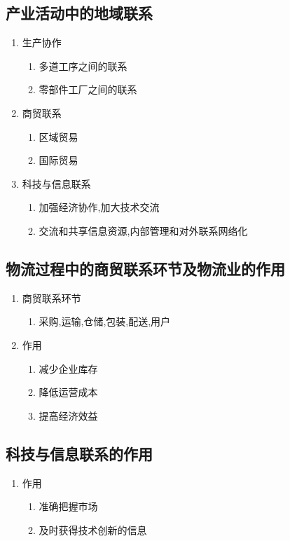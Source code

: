 \documentclass[a4paper]{article}
\begin{document}
    \subsection{产业活动中的地域联系}
    \begin{enumerate}
        \item 生产协作
        \begin{enumerate}
            \item 多道工序之间的联系
            \item 零部件工厂之间的联系
        \end{enumerate}
        \item 商贸联系
        \begin{enumerate}
            \item 区域贸易
            \item 国际贸易
        \end{enumerate}
        \item 科技与信息联系
        \begin{enumerate}
            \item 加强经济协作,加大技术交流
            \item 交流和共享信息资源,内部管理和对外联系网络化
        \end{enumerate}
    \end{enumerate}
    \subsection{物流过程中的商贸联系环节及物流业的作用}
    \begin{enumerate}
        \item 商贸联系环节
        \begin{enumerate}
            \item 采购,运输,仓储,包装,配送,用户
        \end{enumerate}
        \item 作用
        \begin{enumerate}
            \item 减少企业库存
            \item 降低运营成本
            \item 提高经济效益
        \end{enumerate}
    \end{enumerate}
    \subsection{科技与信息联系的作用}
    \begin{enumerate}
        \item 作用
        \begin{enumerate}
            \item 准确把握市场
            \item 及时获得技术创新的信息
        \end{enumerate}
    \end{enumerate}
\end{document}
